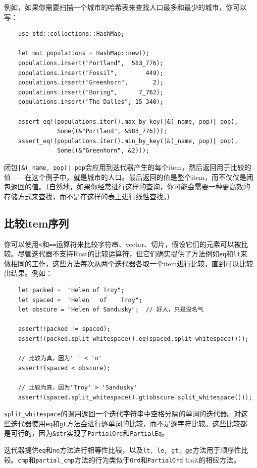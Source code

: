 例如，如果你需要扫描一个城市的哈希表来查找人口最多和最少的城市，你可以写：
\begin{verbatim}
    use std::collections::HashMap;

    let mut populations = HashMap::new();
    populations.insert("Portland",  583_776);
    populations.insert("Fossil",        449);
    populations.insert("Greenhorn",       2);
    populations.insert("Boring",      7_762);
    populations.insert("The Dalles", 15_340);

    assert_eq!(populations.iter().max_by_key(|&(_name, pop)| pop),
               Some((&"Portland", &583_776)));
    assert_eq!(populations.iter().min_by_key(|&(_name, pop)| pop),
               Some((&"Greenhorn", &2)));
\end{verbatim}

闭包\texttt{|\&(\_name, pop)| pop}会应用到迭代器产生的每个item，然后返回用于比较的值——在这个例子中，就是城市的人口。最后返回的值是整个item，而不仅仅是闭包返回的值。（自然地，如果你经常进行这样的查询，你可能会需要一种更高效的存储方式来查找，而不是在这样的表上进行线性查找。）

\subsection{比较item序列}
你可以使用\texttt{<}和\texttt{==}运算符来比较字符串、vector、切片，假设它们的元素可以被比较。尽管迭代器不支持Rust的比较运算符，但它们确实提供了方法例如\texttt{eq}和\texttt{lt}来做相同的工作，这些方法每次从两个迭代器各取一个item进行比较，直到可以比较出结果。例如：
\begin{verbatim}
    let packed =  "Helen of Troy";
    let spaced =  "Helen   of    Troy";
    let obscure = "Helen of Sandusky";  // 好人，只是没名气

    assert!(packed != spaced);
    assert!(packed.split_whitespace().eq(spaced.split_whitespace()));

    // 比较为真，因为' ' < 'o'
    assert!(spaced < obscure);

    // 比较为真，因为'Troy' > 'Sandusky'
    assert!(spaced.split_whitespace().gt(obscure.split_whitespace()));
\end{verbatim}

\texttt{split\_whitespace}的调用返回一个迭代字符串中空格分隔的单词的迭代器。对这些迭代器使用\texttt{eq}和\texttt{gt}方法会进行逐单词的比较，而不是逐字符比较。这些比较都是可行的，因为\texttt{\&str}实现了\texttt{PartialOrd}和\texttt{PartialEq}。

迭代器提供\texttt{eq}和\texttt{ne}方法进行相等性比较，以及\texttt{lt, le, gt, ge}方法用于顺序性比较。\texttt{cmp}和\texttt{partial\_cmp}方法的行为类似于\texttt{Ord}和\texttt{PartialOrd} trait的相应方法。

